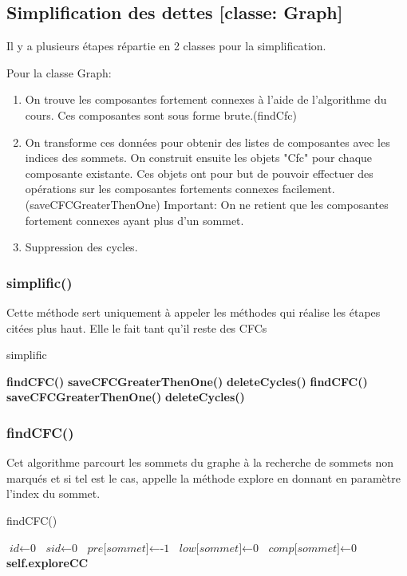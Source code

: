 \documentclass[a4paper]{article}
\begin{document}
\subsection{Simplification des dettes [classe: Graph]}
Il y a plusieurs étapes répartie en 2 classes pour la simplification.

Pour la classe Graph:
\begin{enumerate}
\item On trouve les composantes fortement connexes à l'aide de l'algorithme du cours. Ces composantes sont sous forme brute.(findCfc)
\item On transforme ces données pour obtenir des listes de composantes avec les indices des sommets. On construit ensuite les objets "Cfc" pour chaque composante existante. Ces objets ont pour but de pouvoir effectuer des opérations sur les composantes fortements connexes facilement.(saveCFCGreaterThenOne) Important: On ne retient que les composantes fortement connexes ayant plus d'un sommet.
\item Suppression des cycles.
\end{enumerate}
\subsubsection{simplific()}
Cette méthode sert uniquement à appeler les méthodes qui réalise les étapes citées plus haut. Elle le fait tant qu'il reste des CFCs
\begin{algorithm}[H]
\caption{simplific}\label{simplific}
\begin{algorithmic}[1]
\State \textbf{findCFC()}
\State \textbf{saveCFCGreaterThenOne()}
\State \textbf{deleteCycles()}
\State \textbf{findCFC()}
\State \textbf{saveCFCGreaterThenOne()}
\State \textbf{deleteCycles()}
\EndWhile
\EndProcedure
\end{algorithmic}
\end{algorithm}
\subsubsection{findCFC()}
Cet algorithme parcourt les sommets du graphe à la recherche de sommets non marqués et si tel est le cas, appelle la méthode explore en donnant en paramètre l'index du sommet.
\begin{algorithm}[H]
\caption{findCFC()}\label{findCFC}
\begin{algorithmic}[1]
\State $\textit{id}\gets \text{0}$
\State $\textit{sid}\gets \text{0}$
\State $\textit{pre[sommet]}\gets \text{-1}$
\State $\textit{low[sommet]}\gets \text{0}$
\State $\textit{comp[sommet]}\gets \text{0}$
\EndFor
{}
\State \textbf{self.exploreCC}
\EndIf
\EndFor
\EndProcedure
\end{algorithmic}
\end{algorithm}
\end{document}
